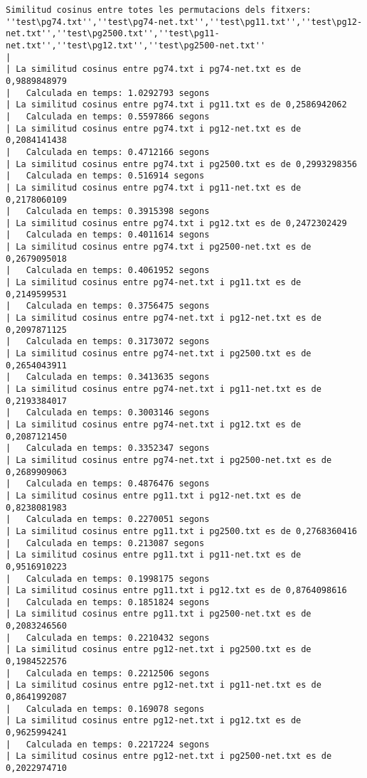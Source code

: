 \documentclass{report}
\begin{document}
\begin{verbatim}
Similitud cosinus entre totes les permutacions dels fitxers:
''test\pg74.txt'',''test\pg74-net.txt'',''test\pg11.txt'',''test\pg12-net.txt'',''test\pg2500.txt'',''test\pg11-net.txt'',''test\pg12.txt'',''test\pg2500-net.txt''
|
| La similitud cosinus entre pg74.txt i pg74-net.txt es de 0,9889848979
|	Calculada en temps: 1.0292793 segons
| La similitud cosinus entre pg74.txt i pg11.txt es de 0,2586942062
|	Calculada en temps: 0.5597866 segons
| La similitud cosinus entre pg74.txt i pg12-net.txt es de 0,2084141438
|	Calculada en temps: 0.4712166 segons
| La similitud cosinus entre pg74.txt i pg2500.txt es de 0,2993298356
|	Calculada en temps: 0.516914 segons
| La similitud cosinus entre pg74.txt i pg11-net.txt es de 0,2178060109
|	Calculada en temps: 0.3915398 segons
| La similitud cosinus entre pg74.txt i pg12.txt es de 0,2472302429
|	Calculada en temps: 0.4011614 segons
| La similitud cosinus entre pg74.txt i pg2500-net.txt es de 0,2679095018
|	Calculada en temps: 0.4061952 segons
| La similitud cosinus entre pg74-net.txt i pg11.txt es de 0,2149599531
|	Calculada en temps: 0.3756475 segons
| La similitud cosinus entre pg74-net.txt i pg12-net.txt es de 0,2097871125
|	Calculada en temps: 0.3173072 segons
| La similitud cosinus entre pg74-net.txt i pg2500.txt es de 0,2654043911
|	Calculada en temps: 0.3413635 segons
| La similitud cosinus entre pg74-net.txt i pg11-net.txt es de 0,2193384017
|	Calculada en temps: 0.3003146 segons
| La similitud cosinus entre pg74-net.txt i pg12.txt es de 0,2087121450
|	Calculada en temps: 0.3352347 segons
| La similitud cosinus entre pg74-net.txt i pg2500-net.txt es de 0,2689909063
|	Calculada en temps: 0.4876476 segons
| La similitud cosinus entre pg11.txt i pg12-net.txt es de 0,8238081983
|	Calculada en temps: 0.2270051 segons
| La similitud cosinus entre pg11.txt i pg2500.txt es de 0,2768360416
|	Calculada en temps: 0.213087 segons
| La similitud cosinus entre pg11.txt i pg11-net.txt es de 0,9516910223
|	Calculada en temps: 0.1998175 segons
| La similitud cosinus entre pg11.txt i pg12.txt es de 0,8764098616
|	Calculada en temps: 0.1851824 segons
| La similitud cosinus entre pg11.txt i pg2500-net.txt es de 0,2083246560
|	Calculada en temps: 0.2210432 segons
| La similitud cosinus entre pg12-net.txt i pg2500.txt es de 0,1984522576
|	Calculada en temps: 0.2212506 segons
| La similitud cosinus entre pg12-net.txt i pg11-net.txt es de 0,8641992087
|	Calculada en temps: 0.169078 segons
| La similitud cosinus entre pg12-net.txt i pg12.txt es de 0,9625994241
|	Calculada en temps: 0.2217224 segons
| La similitud cosinus entre pg12-net.txt i pg2500-net.txt es de 0,2022974710

\end{verbatim}
\end{document}
